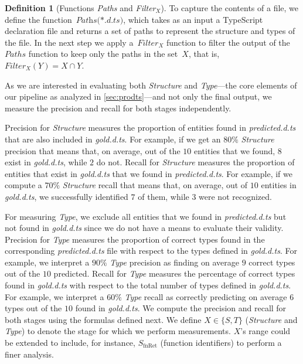\documentclass[sigplan,10pt,review,anonymous]{acmart} %
\theoremstyle{plain}
\theoremstyle{remark}
\theoremstyle{definition}
\newtheorem{defn}{Definition}[section]
\begin{document}
\begin{defn}[Functions \textit{Paths} and \textit{Filter$_X$}]
  To capture the contents of a file, we define the
  function~$\textit{Paths(*.d.ts)}$, which takes as an input a
  TypeScript declaration file and returns a set of paths
  to represent the structure and types of the file.
  In the next step we apply a~$Filter_X$ function to
  filter the output of the~$Paths$ function to keep only the paths in the set~$X$,
  that is,~$Filter_X(Y) =  X \cap Y$.
\end{defn}

As we are interested in evaluating both \textit{Structure}
and \textit{Type}---the core elements of our pipeline as analyzed in \cref{sec:prodts}---and
not only the final output, we measure the precision and recall for both stages independently.

Precision for \textit{Structure} measures the proportion of entities found in \textit{predicted.d.ts}
that are also included in \textit{gold.d.ts}.
%
For example, if we get an $80\%$ \textit{Structure} precision that means
that, on average, out of the $10$ entities that we found, $8$ exist in \textit{gold.d.ts}, while $2$ do not.
%
Recall for \textit{Structure} measures the proportion of entities that exist in \textit{gold.d.ts}
that we found in \textit{predicted.d.ts}.
%
For example, if we compute a $70\%$ \textit{Structure} recall
that means that, on average, out of $10$ entities in \textit{gold.d.ts},
 we successfully identified $7$ of them, while $3$ were not recognized.

For measuring \textit{Type}, we exclude all entities that we found in \textit{predicted.d.ts}
but not found in \textit{gold.d.ts} since we do not have a means to evaluate their validity.
%
Precision for \textit{Type} measures the proportion of correct types
found in the corresponding \textit{predicted.d.ts} file
with respect to the types defined in \textit{gold.d.ts}.
%
For example, we interpret a $90\%$ \textit{Type} precision
as finding on average $9$ correct types out of the $10$ predicted.
%
Recall for \textit{Type} measures the percentage of correct types
found in \textit{gold.d.ts} with respect to the total number of types defined in \textit{gold.d.ts}.
%
For example, we interpret a $60\%$ \textit{Type} recall
as correctly predicting on average $6$ types out of the $10$ found in \textit{gold.d.ts}.
%
We compute the precision and recall for both stages using the formulas defined next.
%
We define $X \in \{S, T\}$ (\textit{Structure} and \textit{Type})
to denote the stage for which we perform measurements.
%
$X$'s range could be extended to include, for instance, 
$S_\text{fnRet}$ (function identifiers) to perform a finer analysis.
\end{document}
